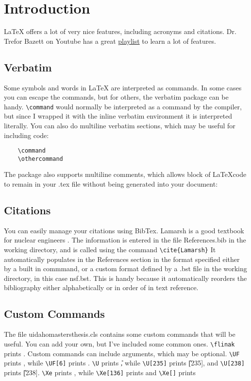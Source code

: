 \chapter{Introduction}
\label{Chapter:Introduction}
\LaTeX \; offers a lot of very nice features, including acronyms and citations. Dr. Trefor Bazett on Youtube has a great \href{https://www.youtube.com/playlist?list=PLHXZ9OQGMqxcWWkx2DMnQmj5os2X5ZR73}{playlist} to learn a lot of features.

\section{Verbatim}
Some symbols and words in \LaTeX \; are interpreted as commands. In some cases you can escape the commands, but for others, the verbatim package can be handy. \verb=\command= would normally be interpreted as a command by the compiler, but since I wrapped it with the inline verbatim environment it is interpreted literally. You can also do multiline verbatim sections, which may be useful for including code:

\begin{verbatim}
    \command
    \othercommand
\end{verbatim}

The package also supports multiline comments, which allows block of \LaTeX  code to remain in your .tex file without being generated into your document:

\begin{comment}
    This is my comment.
    Note that it can span multiple lines.
    This is very useful.
    \end{comment}

\section{Citations}
You can easily manage your citations using BibTex. Lamarsh is a good textbook for nuclear engineers \cite{Lamarsh}. The information is entered in the file References.bib in the working directory, and is called using the command \verb=\cite{Lamarsh}= It automatically populates in the References section in the format specified either by a built in commmand, or a custom format defined by a .bst file in the working directory, in this case nsf.bst. This is handy because it automatically reorders the bibliography either alphabetically or in order of in text reference.

\section{Custom Commands}
The file uidahomastersthesis.cls contains some custom commands that will be useful. You can add your own, but I've included some common ones. \verb=\flinak= prints \flinak. Custom commands can include arguments, which may be optional. \verb=\UF= prints \UF, while \verb=\UF[6]= prints \UF[6]. \verb=\U= prints \U, while \verb=\U[235]= prints \U[235], and \verb=\U[238]= prints \U[238]. \verb=\Xe= prints \Xe, while \verb=\Xe[136]= prints \Xe[136] and \verb=\Xe[]= prints \Xe[]

